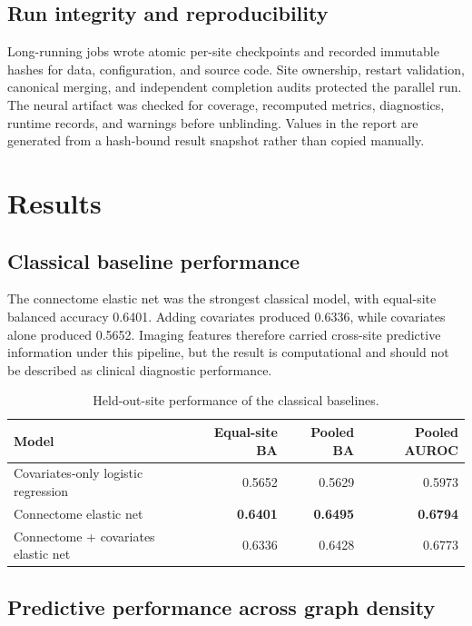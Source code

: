 \documentclass[11pt,a4paper]{article}
\begin{document}
\subsection{Run integrity and reproducibility}

Long-running jobs wrote atomic per-site checkpoints and recorded immutable
hashes for data, configuration, and source code. Site ownership, restart
validation, canonical merging, and independent completion audits protected
the parallel run. The neural artifact was checked for coverage, recomputed
metrics, diagnostics, runtime records, and warnings before unblinding. Values
in the report are generated from a hash-bound result snapshot rather than
copied manually.

\section{Results}

\subsection{Classical baseline performance}

The connectome elastic net was the strongest classical model, with equal-site
balanced accuracy 0.6401. Adding covariates produced 0.6336, while covariates
alone produced 0.5652. Imaging features therefore carried cross-site
predictive information under this pipeline, but the result is computational
and should not be described as clinical diagnostic performance.

\begin{table}[htbp]
\centering
\caption{Held-out-site performance of the classical baselines.}
\label{tab:baselines}
\begin{tabularx}{\textwidth}{@{}Y r r r@{}}
\toprule
\textbf{Model} & \textbf{Equal-site BA} & \textbf{Pooled BA} & \textbf{Pooled AUROC} \\
\midrule
Covariates-only logistic regression & 0.5652 & 0.5629 & 0.5973 \\
Connectome elastic net & \textbf{0.6401} & \textbf{0.6495} & \textbf{0.6794} \\
Connectome + covariates elastic net & 0.6336 & 0.6428 & 0.6773 \\
\bottomrule
\end{tabularx}
\end{table}

\subsection{Predictive performance across graph density}
\end{document}
